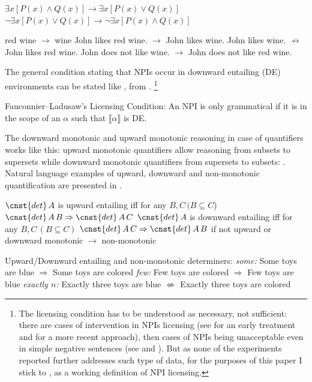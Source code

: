 \documentclass[output=paper,
]{langscibook}
\begin{document}
\ea \label{ex-11} \ea \label{ex-11-a} $\exists x[P(x) \wedge Q(x)] \rightarrow \exists x[P(x) \vee Q(x)]$
\ex \label{ex-11-b} $\neg \exists x[P(x) \vee Q(x)] \rightarrow \neg \exists x[P(x) \wedge Q(x)]$
\z
\z

\ea\label{ex-12} red wine $\rightarrow$ wine
\ea\label{ex-12-a} John likes red wine. $\rightarrow$ John likes wine.
\ex\label{ex-12-b} John likes wine. $\not\rightarrow$ John likes red wine.
\ex\label{ex-12-c} John does not like wine. $\rightarrow$ John does not like red wine.
\z
\z

\noindent The general condition stating that NPIs occur in  downward entailing (DE) environments can be stated like , from \citep[100]{von1999npi}.%
\footnote{The licensing condition has to be understood as necessary, not sufficient: there are cases of intervention in NPIs licensing (see \citealt{linebarger1987negative} for an early treatment and \citealt{homer2008disruption} for a more recent approach), then cases of NPIs being unacceptable even in simple negative sentences (see \citealt{uribe1994interface} and \citealt{Blasczak:2001}). But as none of the experiments reported further addresses such type of data, for the purposes of this paper I stick to , as a working definition of NPI licensing.}

\eanoraggedright\label{ex-13} Fauconnier--Ladusaw's Licensing Condition: An NPI is only
grammatical if it is in the scope of an $\alpha$ such that
$\llbracket \alpha \rrbracket$ is DE.%
\z

\noindent The downward monotonic and upward monotonic reasoning in case of quantifiers works like this:  upward monotonic quantifiers allow reasoning from  subsets to supersets while downward monotonic quantifiers from  supersets to subsets: . Natural language examples of upward, downward and non-monotonic quantification are presented in .

\ea \label{ex-14} \ea $\cnst{det}\,A$ is upward entailing iff for any $B, C\, (B \subseteq C$) $\cnst{det}\,A\,B \Rightarrow \cnst{det}\,A\,C$
\ex $\cnst{det}\,A$ is downward entailing iff
for any $B, C\,(B \subseteq C)$ $\cnst{det}\,A\,C \Rightarrow \cnst{det}\,A\,B$
\ex if not upward or downward monotonic $\rightarrow$ non-monotonic
\z
\z

\ea \label{ex-15} Upward/Downward entailing and non-monotonic determiners:
\ea \textit{some:} Some toys are blue $\Rightarrow$ Some toys are colored
\ex \textit{few:} Few toys are colored $\Rightarrow$ Few toys are blue
\ex \textit{exactly $n$:} Exactly three toys are blue $\not\Leftrightarrow$ Exactly three toys are colored
\z
\z
\end{document}
